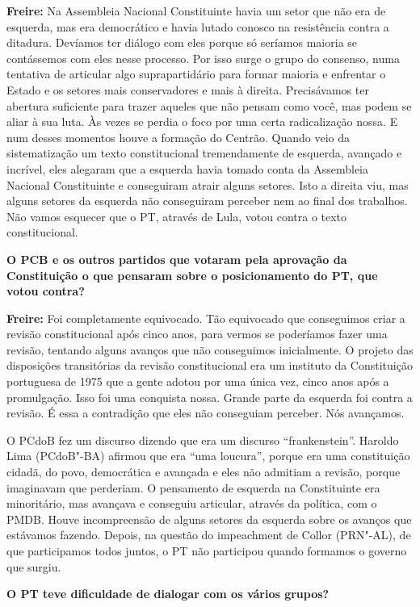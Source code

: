 \textbf{Freire:} Na Assembleia Nacional Constituinte havia um setor que
não era de esquerda, mas era democrático e havia lutado conosco na
resistência contra a ditadura. Devíamos ter diálogo com eles porque só
seríamos maioria se contássemos com eles nesse processo. Por isso surge
o grupo do consenso, numa tentativa de articular algo suprapartidário
para formar maioria e enfrentar o Estado e os setores mais conservadores
e mais à direita. Precisávamos ter abertura suficiente para trazer
aqueles que não pensam como você, mas podem se aliar à sua luta. Às
vezes se perdia o foco por uma certa radicalização nossa. E num desses
momentos houve a formação do Centrão. Quando veio da sistematização um
texto constitucional tremendamente de esquerda, avançado e incrível,
eles alegaram que a esquerda havia tomado conta da Assembleia Nacional
Constituinte e conseguiram atrair alguns setores. Isto a direita viu,
mas alguns setores da esquerda não conseguiram perceber nem ao final dos
trabalhos. Não vamos esquecer que o PT, através de Lula, votou contra o
texto constitucional.

\textbf{O PCB e os outros partidos que votaram pela aprovação da
Constituição o que pensaram sobre o posicionamento do PT, que votou
contra?}

\textbf{Freire:} Foi completamente equivocado. Tão equivocado que
conseguimos criar a revisão constitucional após cinco anos, para vermos
se poderíamos fazer uma revisão, tentando alguns avanços que não
conseguimos inicialmente. O projeto das disposições transitórias da
revisão constitucional era um instituto da Constituição portuguesa de
1975 que a gente adotou por uma única vez, cinco anos após a
promulgação. Isso foi uma conquista nossa. Grande parte da esquerda foi
contra a revisão. É essa a contradição que eles não conseguiam perceber.
Nós avançamos.

O PCdoB fez um discurso dizendo que era um discurso ``frankenstein''.
Haroldo Lima (PCdoB"-BA) afirmou que era ``uma loucura'', porque era uma
constituição cidadã, do povo, democrática e avançada e eles não admitiam
a revisão, porque imaginavam que perderiam. O pensamento de esquerda na
Constituinte era minoritário, mas avançava e conseguiu articular,
através da política, com o PMDB. Houve incompreensão de alguns setores
da esquerda sobre os avanços que estávamos fazendo. Depois, na questão
do impeachment de Collor (PRN"-AL), de que participamos todos juntos, o
PT não participou quando formamos o governo que surgiu.

\textbf{O PT teve dificuldade de dialogar com os vários grupos?}

